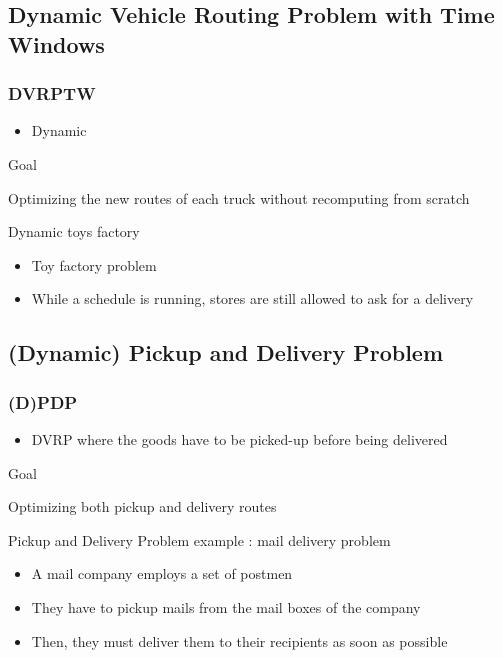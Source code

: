 \documentclass{beamer}
\begin{document}
\subsection*{Dynamic Vehicle Routing Problem with Time Windows}
\begin{frame}
	\frametitle{DVRPTW\cite{Mitrovic01}}
	\begin{itemize}
 		\item Dynamic
	\end{itemize}
	\begin{block}{Goal}
		\begin{center}
			Optimizing the new routes of each truck without recomputing from scratch
		\end{center}
	\end{block}	
	
	\begin{exampleblock}{Dynamic toys factory}
		\begin{itemize}
			\item Toy factory problem
			\item While a schedule is running, stores are still allowed to ask for a delivery
		\end{itemize}
	\end{exampleblock}
\end{frame}

\subsection*{(Dynamic) Pickup and Delivery Problem}
\begin{frame}
 \frametitle{(D)PDP}
	\begin{itemize}
	 \item DVRP where the goods have to be picked-up before being delivered
	\end{itemize}
	
	\begin{block}{Goal}
		\begin{center}
			Optimizing both pickup and delivery routes
		\end{center}
	\end{block}	
	\begin{exampleblock}{Pickup and Delivery Problem example : mail delivery problem}
		\begin{itemize}
			\item A mail company employs a set of postmen
			\item They have to pickup mails from the mail boxes of the company
			\item Then, they must deliver them to their recipients as soon as possible
		\end{itemize}
	\end{exampleblock}

\end{frame}
\end{document}
